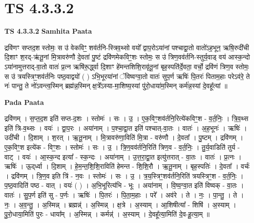 \documentclass[17pt]{extarticle}
\begin{document}

\section{ TS 4.3.3.2 }

\textbf{TS 4.3.3.2 } \newline
\textbf{Samhita Paata} \newline

द्रवि॑णꣳ सप्तद॒श स्तोमः॒ स उ॑ वेकविꣳ॒॒ शव॑र्तनि-स्त्रिव॒थ्सो वयो᳚ द्वाप॒रोऽया॑नां पश्चाद्वा॒तो वातो॑ऽह॒भून॒ ऋषि॒रुदी॑ची दि॒शाꣳ श॒रद्-ऋ॑तू॒नां मि॒त्रावरु॑णौ दे॒वता॑ पु॒ष्टं द्रवि॑णमेकविꣳ॒॒शः स्तोमः॒ स उ॑ त्रिण॒वव॑र्तनि-स्तुर्य॒वाड् वय॑ आस्क॒न्दो ऽया॑नामुत्तराद्-वा॒तो वातः॑ प्र॒त्न ऋषि॑रू॒र्द्ध्वा दि॒शाꣳ हे॑मन्तशिशि॒रावृ॑तू॒नां बृह॒स्पति॑र्दे॒वता॒ वर्चो॒ द्रवि॑णं त्रिण॒व स्तोमः॒ स उ॑ त्रयस्त्रिꣳ॒॒शव॑र्तनिः पष्ठ॒वाद्वयो॑ ( ) ऽभि॒भूरया॑नां ॅविष्वग्वा॒तो वातः॑ सुप॒र्ण ऋषिः॑ पि॒तरः॑ पिताम॒हाः परेऽव॑रे॒ ते नः॑ पान्तु॒ ते नो॑ऽवन्त्व॒स्मिन् ब्रह्म॑न्न॒स्मिन् क्ष॒त्रे᳚ऽस्या-मा॒शिष्य॒स्यां पु॑रो॒धाया॑म॒स्मिन् कर्म॑न्न॒स्यां दे॒वहू᳚त्यां ॥ \newline

\textbf{Pada Paata} \newline

द्रवि॑णम् । स॒प्त॒द॒श इति॑ सप्त-द॒शः । स्तोमः॑ । सः । उ॒ । ए॒क॒विꣳ॒॒शव॑र्तनि॒रित्ये॑कविꣳ॒॒श - व॒र्त॒निः॒ । त्रि॒व॒थ्स इति॑ त्रि-व॒थ्सः । वयः॑ । द्वा॒प॒रः । अया॑नाम् । प॒श्चा॒द्वा॒त इति॑ पश्चात्-वा॒तः । वातः॑ । अ॒ह॒भूनः॑ । ऋषिः॑ । उदी॑ची । दि॒शाम् । श॒रत् । ऋ॒तू॒नाम् । मि॒त्रावरु॑णा॒विति॑ मि॒त्रा - वरु॑णौ । दे॒वता᳚ । पु॒ष्टम् । द्रवि॑णम् । ए॒क॒विꣳ॒॒श इत्ये॑क - विꣳ॒॒शः । स्तोमः॑ । सः । उ॒ । त्रि॒ण॒वव॑र्तनि॒रिति॑ त्रिण॒व - व॒र्त॒निः॒ । तु॒र्य॒वाडिति॑ तुर्य - वाट् । वयः॑ । आ॒स्क॒न्द इत्या᳚ - स्क॒न्दः । अया॑नाम् । उ॒त्त॒रा॒द्वा॒त इत्यु॑त्तरात् - वा॒तः । वातः॑ । प्र॒त्नः । ऋषिः॑ । ऊ॒द्‌र्ध्वा । दि॒शाम् । हे॒म॒न्त॒शि॒शि॒राविति॑ हेमन्त - शि॒शि॒रौ । ऋ॒तू॒नाम् । बृह॒स्पतिः॑ । दे॒वता᳚ । वर्चः॑ । द्रवि॑णम् । त्रि॒ण॒व इति त्रि॑ - न॒वः । स्तोमः॑ । सः । उ॒ । त्र॒य॒स्त्रिꣳ॒॒शव॑र्तनि॒रिति॑ त्रयस्त्रिꣳ॒॒श - व॒र्त॒निः॒ । प॒ष्ठ॒वादिति॑ पष्ठ - वात् । वयः॑ ( ) । अ॒भि॒भूरित्य॑भि - भूः । अया॑नाम् । वि॒ष्व॒ग्वा॒त इति॑ विष्वक् - वा॒तः । वातः॑ । सु॒प॒र्ण इति॑ सु - प॒र्णः । ऋषिः॑ । पि॒तरः॑ । पि॒ता॒म॒हाः । परे᳚ । अव॑रे । ते । नः॒ । पा॒न्तु॒ । ते । नः॒ । अ॒व॒न्तु॒ । अ॒स्मिन्न् । ब्रह्मन्न्॑ । अ॒स्मिन्न् । क्ष॒त्रे । अ॒स्याम् । आ॒शिषीत्या᳚ - शिषि॑ । अ॒स्याम् । पु॒रो॒धाया॒मिति॑ पुरः - धाया᳚म् । अ॒स्मिन्न् । कर्मन्न्॑ । अ॒स्याम् । दे॒वहू᳚त्या॒मिति॑ दे॒व-हू॒त्या॒म् ॥  \newline
\end{document}

